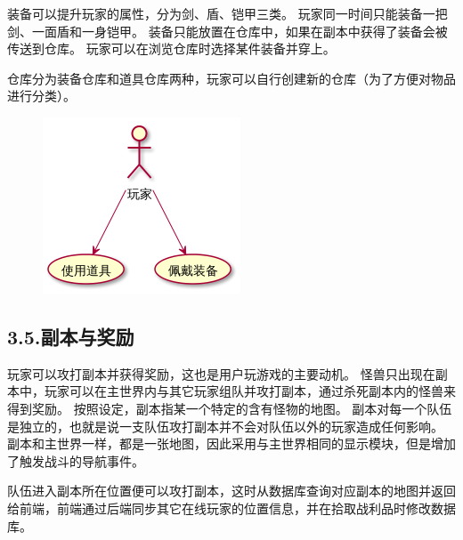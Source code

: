 \documentclass{article}
\begin{document}
装备可以提升玩家的属性，分为剑、盾、铠甲三类。 玩家同一时间只能装备一把剑、一面盾和一身铠甲。 装备只能放置在仓库中，如果在副本中获得了装备会被传送到仓库。 玩家可以在浏览仓库时选择某件装备并穿上。%

仓库分为装备仓库和道具仓库两种，玩家可以自行创建新的仓库（为了方便对物品进行分类）。%

\begin{figure}[tbp]%
\begin{mdcenter}%

\noindent{}\includegraphics[keepaspectratio=true,width=\dimwidth{0.30}]{./img/4}{}%

\mdhr{}%

\noindent{}%
\end{mdcenter}%
\end{figure}%

\subsection{3.5.\hspace*{0.5em}副本与奖励}\label{35}%

\noindent{}玩家可以攻打副本并获得奖励，这也是用户玩游戏的主要动机。 怪兽只出现在副本中，玩家可以在主世界内与其它玩家组队并攻打副本，通过杀死副本内的怪兽来得到奖励。 按照设定，副本指某一个特定的含有怪物的地图。 副本对每一个队伍是独立的，也就是说一支队伍攻打副本并不会对队伍以外的玩家造成任何影响。 副本和主世界一样，都是一张地图，因此采用与主世界相同的显示模块，但是增加了触发战斗的导航事件。%

队伍进入副本所在位置便可以攻打副本，这时从数据库查询对应副本的地图并返回给前端，前端通过后端同步其它在线玩家的位置信息，并在拾取战利品时修改数据库。%
\end{document}
